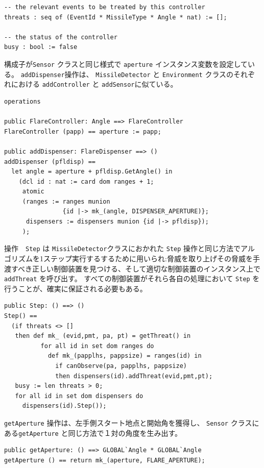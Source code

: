 \documentclass[\pformat,12pt]{jreport}
\begin{document}
\begin{lstlisting}
-- the relevant events to be treated by this controller
threats : seq of (EventId * MissileType * Angle * nat) := [];

-- the status of the controller
busy : bool := false
\end{lstlisting}

構成子が\texttt{Sensor} クラスと同じ様式で \texttt{aperture} インスタンス変数を設定している。
 \texttt{addDispenser}操作は、 \texttt{MissileDetector} と \texttt{Environment} クラスのそれぞれにおける \texttt{addController} と \texttt{addSensor}に似ている。

\begin{lstlisting}
operations

public FlareController: Angle ==> FlareController
FlareController (papp) == aperture := papp;

public addDispenser: FlareDispenser ==> ()
addDispenser (pfldisp) ==
  let angle = aperture + pfldisp.GetAngle() in
    (dcl id : nat := card dom ranges + 1;
     atomic
     (ranges := ranges munion 
                {id |-> mk_(angle, DISPENSER_APERTURE)};
      dispensers := dispensers munion {id |-> pfldisp});
     );
\end{lstlisting}

操作　\texttt{Step} は  \texttt{MissileDetector}クラスにおかれた \texttt{Step} 操作と同じ方法でアルゴリズムを1ステップ実行するするために用いられ:脅威を取り上げその脅威を手渡すべき正しい制御装置を見つける、そして適切な制御装置のインスタンス上で \texttt{addThreat} を呼び出す。
すべての制御装置がそれら各自の処理において \texttt{Step} を行うことが、確実に保証される必要もある。

\begin{lstlisting}
public Step: () ==> ()
Step() ==
  (if threats <> []
   then def mk_ (evid,pmt, pa, pt) = getThreat() in
          for all id in set dom ranges do
            def mk_(papplhs, pappsize) = ranges(id) in
              if canObserve(pa, papplhs, pappsize)
              then dispensers(id).addThreat(evid,pmt,pt);
   busy := len threats > 0;
   for all id in set dom dispensers do
     dispensers(id).Step());
\end{lstlisting}

\texttt{getAperture} 操作は、左手側スタート地点と開始角を獲得し、 \texttt{Sensor} クラスにある\texttt{getAperture} と同じ方法で１対の角度を生み出す。

\begin{lstlisting}
public getAperture: () ==> GLOBAL`Angle * GLOBAL`Angle
getAperture () == return mk_(aperture, FLARE_APERTURE);
\end{lstlisting}
\end{document}
